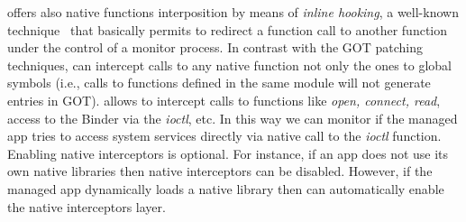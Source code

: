 \asd offers also  native functions interposition by means of \textit{inline hooking}, a well-known technique~\cite{inlinehook} that basically permits to redirect a function call to another function under the control of a monitor process. In contrast with the GOT patching techniques, \asd can intercept calls to  any native function not only the ones to  global symbols (i.e., calls to functions defined in the same module will not generate entries in GOT). \asd allows to intercept calls to functions like \textit{open, connect, read}, access to the Binder via the \textit{ioctl}, etc. In this way we can  monitor if the managed app tries to access system services directly via native call to the \textit{ioctl} function. Enabling native interceptors is optional. For instance, if an app does not use its own native libraries then native interceptors can be disabled. However, if the managed app dynamically loads a native library then \asd can automatically enable the native interceptors layer.
         

